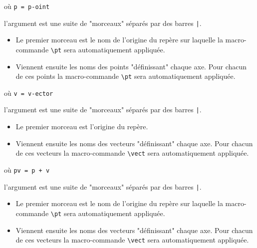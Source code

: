 \documentclass[12pt,a4paper]{article}
\makeatletter
\newcommand\pt[1]{\mathrm{#1}}
\newcommand\@no@point[1]{%
		\IfStrEq{#1}{i}{%
			\imath%
		}{%
			\IfStrEq{#1}{j}{%
				\jmath%
			}{%
				#1
			}%
		}%
	}
\newcommand\vect{\@ifstar{\@vect@star}{\@vect@no@star}}
\newcommand*\@vect@star[1]{\vv*{\@no@point{#1}}}
\newcommand*\@vect@no@star[1]{\vv{\@no@point{#1}}}
\makeatother
\begin{document}
\bigskip

 où \quad \verb+p = p-oint+

\IDarg{} l'argument est une suite de "morceaux" séparés par des barres \verb+|+.

\begin{itemize}[topsep=0pt]
	\item Le premier morceau est le nom de l'origine du repère sur laquelle la macro-commande \verb+\pt+ sera automatiquement appliquée.
	
	\item Viennent ensuite les noms des points "définissant" chaque axe. Pour chacun de ces points la macro-commande \verb+\pt+ sera automatiquement appliquée.
\end{itemize}


\bigskip

 où \quad \verb+v = v-ector+

\IDarg{} l'argument est une suite de "morceaux" séparés par des barres \verb+|+.

\begin{itemize}[topsep=0pt]
	\item Le premier morceau est l'origine du repère.
	
	\item Viennent ensuite les noms des vecteurs "définissant" chaque axe. Pour chacun de ces vecteurs la macro-commande \verb+\vect+ sera automatiquement appliquée.
\end{itemize}


\bigskip

 où \quad \verb&pv = p + v&

\IDarg{} l'argument est une suite de "morceaux" séparés par des barres \verb+|+.

\begin{itemize}[topsep=0pt]
	\item Le premier morceau est le nom de l'origine du repère sur laquelle la macro-commande \verb+\pt+ sera automatiquement appliquée.
	
	\item Viennent ensuite les noms des vecteurs "définissant" chaque axe. Pour chacun de ces vecteurs la macro-commande \verb+\vect+ sera automatiquement appliquée.
\end{itemize}
\end{document}
